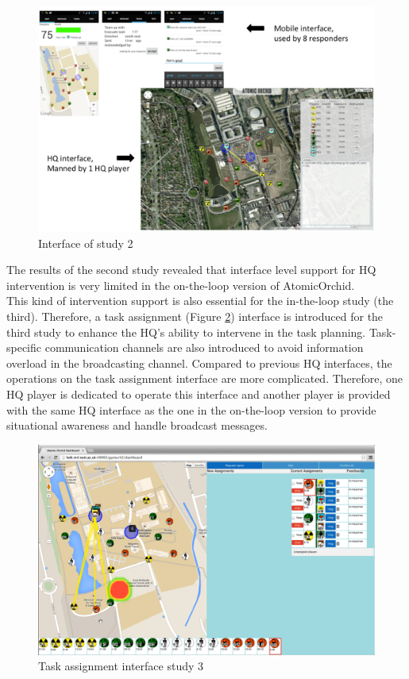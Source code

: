 \begin{figure}[H]
  \centering
  \includegraphics[width=1\textwidth]{img/conclusion/study2interface}
  \caption{Interface of study 2}
  \label{fig:study2interface}
\end{figure}

The results of the second study revealed that interface level support for HQ intervention is very limited in the on-the-loop version of AtomicOrchid. \\

This kind of intervention support is also essential for the in-the-loop study (the third). Therefore, a task assignment (Figure \ref{fig:study3interfaceHQ}) interface is introduced for the third study to enhance the HQ's ability to intervene in the task planning. Task-specific communication channels are also introduced to avoid information overload in the broadcasting channel. Compared to previous HQ interfaces, the operations on the task assignment interface are more complicated. Therefore, one HQ player is dedicated to operate this interface and another player is provided with the same HQ interface as the one in the on-the-loop version to provide situational awareness and handle broadcast messages. 

\begin{figure}[H]
  \centering
  \includegraphics[width=1\textwidth]{img/conclusion/study3interfaceHQ}
  \caption{Task assignment interface study 3}
  \label{fig:study3interfaceHQ}
\end{figure}

